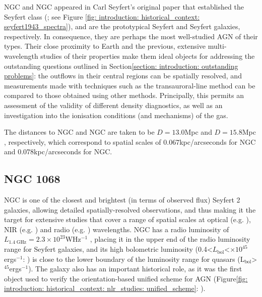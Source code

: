 NGC and NGC appeared in Carl Seyfert's original paper that established the Seyfert class (\citealt{Seyfert1943}; see Figure \ref{fig: introduction: historical_context: seyfert1943_spectra}), and are the prototypical Seyfert and Seyfert galaxies, respectively. In consequence, they are perhaps the most well-studied AGN of their types. Their close proximity to Earth and the previous, extensive multi-wavelength studies of their properties make them ideal objects for addressing the outstanding questions outlined in Section\;\ref{section: introduction: outstanding problems}: the outflows in their central regions can be spatially resolved, and measurements made with techniques such as the transauroral-line method can be compared to those obtained using other methods. Principally, this permits an assessment of the validity of different density diagnostics, as well as an investigation into the ionisation conditions (and mechanisms) of the gas.

The distances to NGC and NGC are taken to be $D = 13.0$\;Mpc \citep{Revalski2021} and $D = 15.8$\;Mpc \citep{Yuan2020}, respectively, which correspond to spatial scales of 0.067\;kpc/arcseconds for NGC and 0.078\;kpc/arcseconds for NGC.

\newpage

\subsection{NGC 1068}
\label{section: stis_seyferts: ngc1068}

NGC is one of the closest and brightest (in terms of observed flux) Seyfert 2 galaxies, allowing detailed spatially-resolved observations, and thus making it the target for extensive studies that cover a range of spatial scales at optical (e.g. \citealt{Cecil1990, Evans1991, Axon1998, Crenshaw2000a, Kraemer2000III, Das2006}), NIR (e.g. \citealt{Raban2009, MUllerSanchez2009, May2017}) and radio (e.g. \citealt{Wilson1983, Gallimore1996, GarciaBurillo2014, GarciaBurillo2019}) wavelengths. NGC has a radio luminosity of $L_\mathrm{1.4\;GHz}=2.3\times10^{23}$\;W\;Hz$^{-1}$ \citep{Ulvestad1984}, placing it in the upper end of the radio luminosity range for Seyfert galaxies, and its high bolometric luminosity (\mbox{0.4\;\textless\;$L_\mathrm{bol}$\textless{}$\times10^{45}$\;erg\;s$^{-1}$}: \citealt{Woo2002, AlonsoHerrero2011, LopezRodriguez2018, Gravity2020}) is close to the lower boundary of the luminosity range for quasars (L$_\mathrm{bol}$\;\textgreater{}$^{45}$\;erg\;s$^{-1}$). The galaxy also has an important historical role, as it was the first object used to verify the orientation-based unified scheme for AGN (Figure\;\ref{fig: introduction: historical_context: nlr_studies: unified_scheme}: \citealt{Antonucci1985}).

